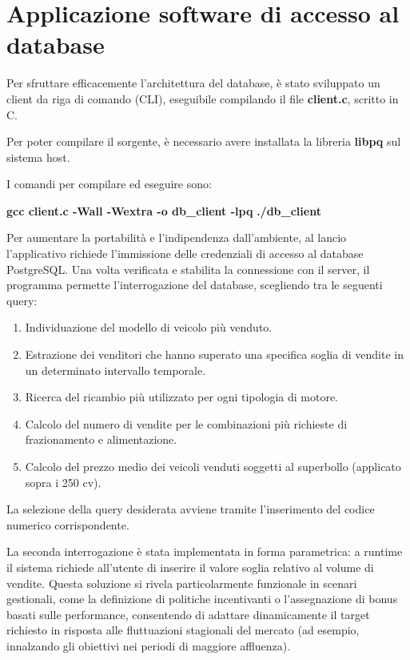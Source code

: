 \vspace{0.5cm}
\section{Applicazione software di accesso al database}

Per sfruttare efficacemente l'architettura del database, è stato
sviluppato un client da riga di comando (CLI), eseguibile compilando
il file \textbf{client.c}, scritto in C.

Per poter compilare il sorgente, è necessario avere installata la libreria
\textbf{libpq} sul sistema host.

I comandi per compilare ed eseguire sono:

\textbf{gcc client.c -Wall -Wextra -o  db\_client -lpq} \newline \textbf{./db\_client}

Per aumentare la portabilità e l'indipendenza dall'ambiente, al lancio
l'applicativo richiede l'immissione delle credenziali di accesso al 
database PostgreSQL. Una volta verificata e stabilita la connessione con
il server, il programma permette l'interrogazione del database,
scegliendo tra le seguenti query:
\begin{enumerate}
    \item Individuazione del modello di veicolo più venduto.
    \item Estrazione dei venditori che hanno superato una specifica
          soglia di vendite in un determinato intervallo temporale.
    \item Ricerca del ricambio più utilizzato per ogni tipologia
          di motore.
    \item Calcolo del numero di vendite per le combinazioni più richieste
          di frazionamento e alimentazione.
    \item Calcolo del prezzo medio dei veicoli venduti soggetti al
          superbollo (applicato sopra i 250 cv).
\end{enumerate}

La selezione della query desiderata avviene tramite l'inserimento del
codice numerico corrispondente. 

La seconda interrogazione è stata implementata in forma parametrica: a
runtime il sistema richiede all'utente di inserire il
valore soglia relativo al volume di vendite. Questa soluzione si rivela
particolarmente funzionale in scenari gestionali, come la definizione di
politiche incentivanti o l'assegnazione di bonus basati sulle performance, 
consentendo di adattare dinamicamente il target richiesto in risposta
alle fluttuazioni stagionali del mercato (ad esempio, innalzando gli
obiettivi nei periodi di maggiore affluenza).

